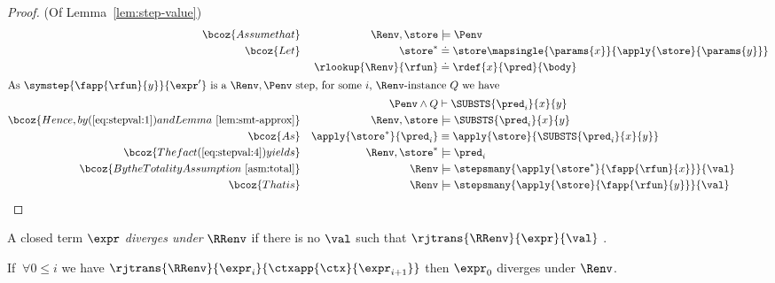 
\begin{proof} (Of Lemma~\ref{lem:step-value})
\begin{alignat}{3}
\bcoz{Assume that}
  && \Renv, \store & \models \Penv \label{eq:stepval:1} \\
\bcoz{Let}
  && \store^*               & \doteq \store \mapsingle{\params{x}}{\apply{\store}{\params{y}}} \label{eq:stepval:2}\\
  && \rlookup{\Renv}{\rfun} & \doteq \rdef{x}{\pred}{\body} \label{eq:stepval:3} \\
\intertext{As $\symstep{\fapp{\rfun}{y}}{\expr'}$ is a $\Renv,\Penv$ step,
for some $i$, \Renv-instance $Q$ we have}
  && \Penv \wedge Q & \vdash \SUBSTS{\pred_i}{x}{y} \notag \\
\bcoz{Hence, by (\ref{eq:stepval:1}) and Lemma~\ref{lem:smt-approx}}
  && \Renv, \store  & \models \SUBSTS{\pred_i}{x}{y} \label{eq:stepval:4}\\
\bcoz{As}
  && \apply{\store^*}{\pred_i}
  & \equiv \apply{\store}{\SUBSTS{\pred_i}{x}{y}} \\
\bcoz{The fact (\ref{eq:stepval:4}) yields}
  && \Renv, \store^*  & \models \pred_i \notag \\
\bcoz{By the Totality Assumption~\ref{asm:total}}
  && \Renv & \models \stepsmany{\apply{\store^*}{\fapp{\rfun}{x}}}{\val} \notag \\
\bcoz{That is}
  && \Renv & \models \stepsmany{\apply{\store}{\fapp{\rfun}{y}}}{\val} \notag
\end{alignat}
\end{proof}



%
A closed term $\expr$ \emph{diverges under}
$\RRenv$ if there is no $\val$ such that
$\rjtrans{\RRenv}{\expr}{\val}$ .

\begin{lemma} \label{lem:div} %
If $\ \forall 0 \leq i$ we have
$\rjtrans{\RRenv}{\expr_i}{\ctxapp{\ctx}{\expr_{i+1}}}$
then $\expr_0$ diverges under $\Renv$.
\end{lemma}


